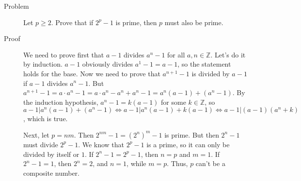 \begin{description}
\item[Problem] Let $p \ge 2$. Prove that if $2^p - 1$ is prime, then $p$ must
also be prime.

\item[Proof] We need to prove first that $a - 1$ divides $a^n - 1$ for all $a,
n \in \mathbb Z$. Let's do it by induction. $a - 1$ obviously divides $a^1 - 1
= a - 1$, so the statement holds for the base. Now we need to prove that
$a^{n+1} - 1$ is divided by $a - 1$ if $a-1$ divides $a^n - 1$. But $a^{n+1}-1
= a \cdot a^n - 1 = a \cdot a^n - a^n + a^n - 1 = a^n (a - 1) + (a^n - 1)$.  By
the induction hypothesis, $a^n - 1 = k(a-1)$ for some $k \in \mathbb Z$, so $a
- 1 | a^n (a - 1) + (a^n - 1) \iff a - 1 | a^n (a-1) + k(a-1) \iff a - 1 | (a -
1) (a^n + k)$, which is true.

Next, let $p = nm$. Then $2^{nm} - 1 = \left(2^n\right)^m - 1$ is prime. But
then $2^n - 1$ must divide $2^p - 1$.  We know that $2^p - 1$ is a prime, so it
can only be divided by itself or $1$. If $2^n - 1 = 2^p - 1$, then $n = p$ and
$m = 1$. If $2^n - 1 = 1$, then $2^n = 2$, and $n = 1$, while $m = p$. Thus,
$p$ can't be a composite number.

\end{description}
